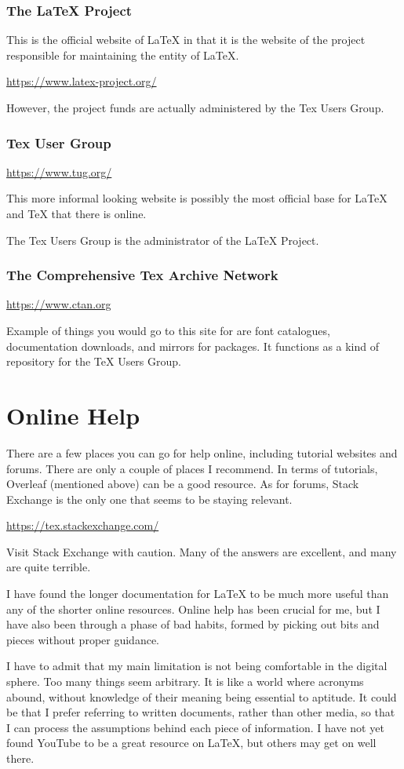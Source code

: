 \documentclass[11pt, oneside]{memoir}
\begin{document}
\subsection{The LaTeX Project}

This is the official website of LaTeX in that it is the website of the project responsible for maintaining the entity of LaTeX.

\url{https://www.latex-project.org/}

However, the project funds are actually administered by the Tex Users Group.

\subsection{Tex User Group}

\url{https://www.tug.org/}

This more informal looking website is possibly the most official base for LaTeX and TeX that there is online. 

The Tex Users Group is the administrator of the LaTeX Project.

\subsection{The Comprehensive Tex Archive Network}
\url{https://www.ctan.org}

Example of things you would go to this site for are font catalogues, documentation downloads, and mirrors for packages. It functions as a kind of repository for the TeX Users Group.

\chapter{Online Help}

There are a few places you can go for help online, including tutorial websites and forums. There are only a couple of places I recommend. In terms of tutorials, Overleaf (mentioned above) can be a good resource. As for forums, Stack Exchange is the only one that seems to be staying relevant.

\url{https://tex.stackexchange.com/}

Visit Stack Exchange with caution. Many of the answers are excellent, and many are quite terrible.

I have found the longer documentation for LaTeX to be much more useful than any of the shorter online resources. Online help has been crucial for me, but I have also been through a phase of bad habits, formed by picking out bits and pieces without proper guidance.

I have to admit that my main limitation is not being comfortable in the digital sphere. Too many things seem arbitrary. It is like a world where acronyms abound, without knowledge of their meaning being essential to aptitude. It could be that I prefer referring to written documents, rather than other media, so that I can process the assumptions behind each piece of information. I have not yet found YouTube to be a great resource on LaTeX, but others may get on well there.
\end{document}

